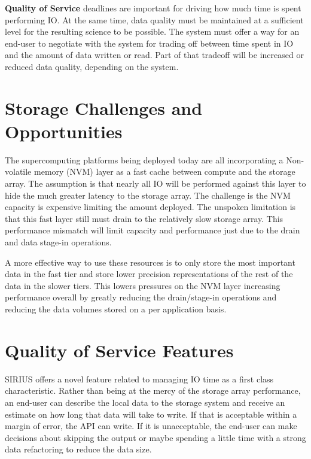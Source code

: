 \documentclass[letterpaper,twocolumn,10pt]{article}
\begin{document}
\noindent\textbf{Quality of Service} deadlines are important for driving how
much time is spent performing IO. At the same time, data quality must be
maintained at a sufficient level for the resulting science to be possible.
The system must offer a way for an end-user to negotiate with the system for
trading off between time spent in IO and the amount of data written or read.
Part of that tradeoff will be increased or reduced data quality, depending on
the system.

\section{Storage Challenges and Opportunities}
\label{sec:storage}

The supercomputing platforms being deployed today are all incorporating a
Non-volatile memory (NVM) layer as a fast cache between compute and the storage
array. The assumption is that nearly all IO will be performed against this
layer to hide the much greater latency to the storage array. The challenge is
the NVM capacity is expensive limiting the amount deployed. The unspoken
limitation is that this fast layer still must drain to the relatively slow
storage array. This performance mismatch will limit capacity and performance
just due to the drain and data stage-in operations.

A more effective way to use these resources is to only store the most
important data in the fast tier and store lower precision representations of
the rest of the data in the slower tiers. This lowers pressures on the NVM
layer increasing performance overall by greatly reducing the drain/stage-in
operations and reducing the data volumes stored on a per application basis.

\section{Quality of Service Features}
\label{sec:qos}

SIRIUS offers a novel feature related to managing IO time as a first class
characteristic. Rather than being at the mercy of the storage array
performance, an end-user can describe the local data to the storage system and
receive an estimate on how long that data will take to write. If that is
acceptable within a margin of error, the API can write. If it is unacceptable,
the end-user can make decisions about skipping the output or maybe spending a
little time with a strong data refactoring to reduce the data size.
\end{document}
